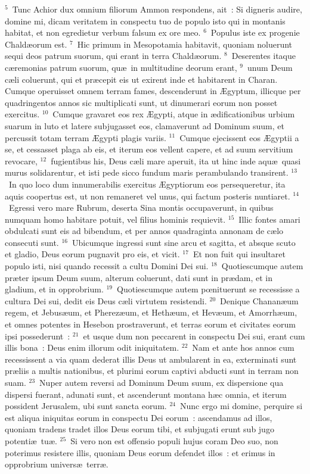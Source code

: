 ${}^{5}$~Tunc Achior dux omnium filiorum Ammon respondens, ait~: Si digneris audire, domine mi, dicam veritatem in conspectu tuo de populo isto qui in montanis habitat, et non egredietur verbum falsum ex ore meo.
${}^{6}$~Populus iste ex progenie Chald\ae orum est.
${}^{7}$~Hic primum in Mesopotamia habitavit, quoniam noluerunt sequi deos patrum suorum, qui erant in terra Chald\ae orum.
${}^{8}$~Deserentes itaque c\ae remonias patrum suorum, qu\ae\ in multitudine deorum erant,
${}^{9}$~unum Deum c\ae li coluerunt, qui et pr\ae cepit eis ut exirent inde et habitarent in Charan. Cumque operuisset omnem terram fames, descenderunt in \AE gyptum, illicque per quadringentos annos sic multiplicati sunt, ut dinumerari eorum non posset exercitus.
${}^{10}$~Cumque gravaret eos rex \AE gypti, atque in \ae dificationibus urbium suarum in luto et latere subjugasset eos, clamaverunt ad Dominum suum, et percussit totam terram \AE gypti plagis variis.
${}^{11}$~Cumque ejecissent eos \AE gyptii a se, et cessasset plaga ab eis, et iterum eos vellent capere, et ad suum servitium revocare,
${}^{12}$~fugientibus his, Deus c\ae li mare aperuit, ita ut hinc inde aqu\ae\ quasi murus solidarentur, et isti pede sicco fundum maris perambulando transirent.
${}^{13}$~In quo loco dum innumerabilis exercitus \AE gyptiorum eos persequeretur, ita aquis coopertus est, ut non remaneret vel unus, qui factum posteris nuntiaret.
${}^{14}$~Egressi vero mare Rubrum, deserta Sina montis occupaverunt, in quibus numquam homo habitare potuit, vel filius hominis requievit.
${}^{15}$~Illic fontes amari obdulcati sunt eis ad bibendum, et per annos quadraginta annonam de c\ae lo consecuti sunt.
${}^{16}$~Ubicumque ingressi sunt sine arcu et sagitta, et absque scuto et gladio, Deus eorum pugnavit pro eis, et vicit.
${}^{17}$~Et non fuit qui insultaret populo isti, nisi quando recessit a cultu Domini Dei sui.
${}^{18}$~Quotiescumque autem pr\ae ter ipsum Deum suum, alterum coluerunt, dati sunt in pr\ae dam, et in gladium, et in opprobrium.
${}^{19}$~Quotiescumque autem pœnituerunt se recessisse a cultura Dei sui, dedit eis Deus c\ae li virtutem resistendi.
${}^{20}$~Denique Chanan\ae um regem, et Jebus\ae um, et Pherez\ae um, et Heth\ae um, et Hev\ae um, et Amorrh\ae um, et omnes potentes in Hesebon prostraverunt, et terras eorum et civitates eorum ipsi possederunt~:
${}^{21}$~et usque dum non peccarent in conspectu Dei sui, erant cum illis bona~: Deus enim illorum odit iniquitatem.
${}^{22}$~Nam et ante hos annos cum recessissent a via quam dederat illis Deus ut ambularent in ea, exterminati sunt pr\ae liis a multis nationibus, et plurimi eorum captivi abducti sunt in terram non suam.
${}^{23}$~Nuper autem reversi ad Dominum Deum suum, ex dispersione qua dispersi fuerant, adunati sunt, et ascenderunt montana h\ae c omnia, et iterum possident Jerusalem, ubi sunt sancta eorum.
${}^{24}$~Nunc ergo mi domine, perquire si est aliqua iniquitas eorum in conspectu Dei eorum~: ascendamus ad illos, quoniam tradens tradet illos Deus eorum tibi, et subjugati erunt sub jugo potenti\ae\ tu\ae .
${}^{25}$~Si vero non est offensio populi hujus coram Deo suo, non poterimus resistere illis, quoniam Deus eorum defendet illos~: et erimus in opprobrium univers\ae\ terr\ae .


